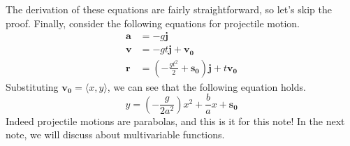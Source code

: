 \documentclass[../../../main.tex]{subfiles}
\begin{document}
The derivation of these equations are fairly straightforward, so let's
skip the proof. Finally, consider the following equations for
projectile motion.
\begin{align*}
    \mathbf{a} &= -g \mathbf{j} \\
    \mathbf{v} &= -gt \mathbf{j} + \mathbf{v_0} \\
    \mathbf{r}
    &= \left( -\frac{gt^2}{2} + \mathbf{s_0} \right) \mathbf{j}
        + t\mathbf{v_0}
\end{align*}
Substituting $\mathbf{v_0} = \langle x, y \rangle$, we can see that
the following equation holds.
\[
y = \left( -\frac{g}{2a^2} \right) x^2 + \frac{b}{a} x + \mathbf{s_0}
\]
Indeed projectile motions are parabolas, and this is it for this note!
In the next note, we will discuss about multivariable functions.
\end{document}
